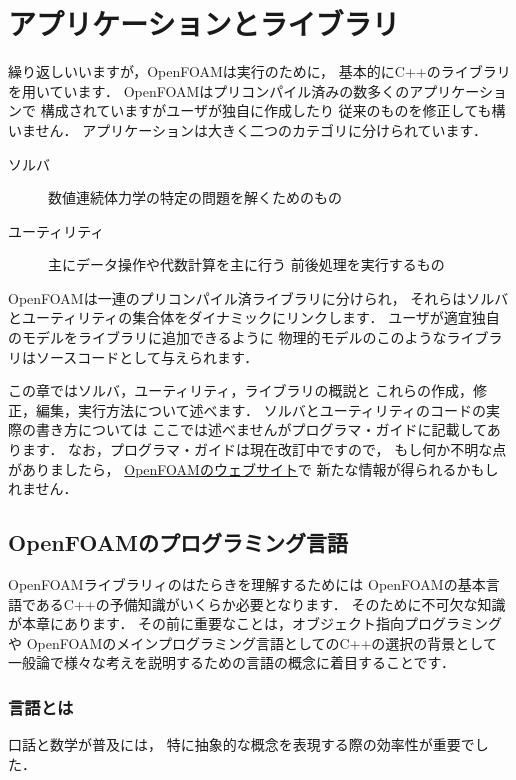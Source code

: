\chapter{アプリケーションとライブラリ}
\label{chap:3}
%
%
%
%
繰り返しいいますが，OpenFOAMは実行のために，
基本的にC++のライブラリを用いています．
OpenFOAMはプリコンパイル済みの数多くのアプリケーションで
構成されていますがユーザが独自に作成したり
従来のものを修正しても構いません．
アプリケーションは大きく二つのカテゴリに分けられています．
\begin{description}
 \item[ソルバ] 数値連続体力学の特定の問題を解くためのもの
 \item[ユーティリティ] 主にデータ操作や代数計算を主に行う
            前後処理を実行するもの
\end{description}
OpenFOAMは一連のプリコンパイル済ライブラリに分けられ，
それらはソルバとユーティリティの集合体をダイナミックにリンクします．
ユーザが適宜独自のモデルをライブラリに追加できるように
物理的モデルのこのようなライブラリはソースコードとして与えられます．

この章ではソルバ，ユーティリティ，ライブラリの概説と
これらの作成，修正，編集，実行方法について述べます．
ソルバとユーティリティのコードの実際の書き方については
ここでは述べませんがプログラマ・ガイドに記載してあります．
なお，プログラマ・ガイドは現在改訂中ですので，
もし何か不明な点がありましたら，
\href{http://www.openfoam.org}{OpenFOAMのウェブサイト}で
新たな情報が得られるかもしれません．



\section{OpenFOAMのプログラミング言語}
\label{sec:3.1}
OpenFOAMライブラリィのはたらきを理解するためには
OpenFOAMの基本言語であるC++の予備知識がいくらか必要となります．
そのために不可欠な知識が本章にあります．
その前に重要なことは，オブジェクト指向プログラミングや
OpenFOAMのメインプログラミング言語としてのC++の選択の背景として
一般論で様々な考えを説明するための言語の概念に着目することです．


\subsection{言語とは}
\label{ssec:3.1.1}
口話と数学が普及には，
特に抽象的な概念を表現する際の効率性が重要でした．

